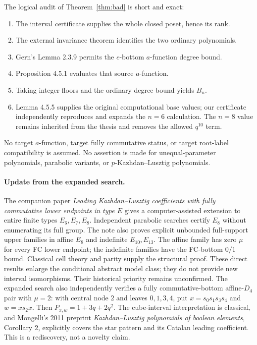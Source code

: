 \documentclass[11pt]{article}
\theoremstyle{definition}\newtheorem{definition}[theorem]{Definition}
\theoremstyle{remark}\newtheorem{remark}[theorem]{Remark}
\begin{document}
The logical audit of Theorem~\ref{thm:bad} is short and exact:
\begin{enumerate}
\item The interval certificate supplies the whole closed poset, hence its rank.
\item The external invariance theorem identifies the two ordinary polynomials.
\item Gern's Lemma 2.3.9 permits the $e$-bottom $a$-function degree bound.
\item Proposition 4.5.1 evaluates that source $a$-function.
\item Taking integer floors and the ordinary degree bound yields $B_n$.
\item Lemma 4.5.5 supplies the original computational base values;
our certificate independently reproduces and expands the $n=6$
calculation. The $n=8$ value remains inherited from the thesis and
removes the allowed $q^{10}$ term.
\end{enumerate}
No target $a$-function, target fully commutative status, or
target root-label compatibility is assumed. No assertion is made
for unequal-parameter polynomials, parabolic variants, or
$p$-Kazhdan--Lusztig polynomials.

\paragraph{Update from the expanded search.}
The companion paper \emph{Leading Kazhdan--Lusztig coefficients with
fully commutative lower endpoints in type $E$} gives a
computer-assisted extension to entire finite types $E_6,E_7,E_8$.
Independent parabolic searches certify $E_8$ without enumerating its full
group. The note also proves explicit unbounded full-support upper families
in affine $E_8$ and indefinite $E_{10},E_{13}$. The affine family has zero
$\mu$ for every FC lower endpoint; the indefinite families have the FC-bottom
$0/1$ bound. Classical cell theory and parity supply the structural proof.
These direct results enlarge the conditional abstract model class; they do
not provide new interval isomorphisms. Their historical priority remains
unconfirmed. The expanded search also independently
verifies a fully commutative-bottom affine-$D_4$ pair with $\mu=2$:
with central node $2$ and leaves $0,1,3,4$, put $x=s_0s_1s_3s_4$ and
$w=xs_2x$. Then $P_{x,w}=1+3q+2q^2$. The cube-interval interpretation is
classical, and Mongelli's 2011 preprint \emph{Kazhdan--Lusztig polynomials
of boolean elements}, Corollary 2, explicitly covers the star pattern and
its Catalan leading coefficient. This is a rediscovery, not a novelty claim.
\end{document}
